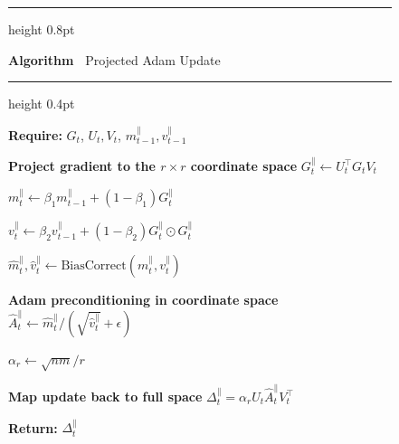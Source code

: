 \documentclass{article} %
\begin{document}
\begin{figure}
    \vspace{-10pt}
    \centering

    \hrule height 0.8pt

    \label{alg:resqadam-core}

    \noindent
    \begin{minipage}[c][1.1\baselineskip][c]{\linewidth}
        \raggedright
        \textbf{Algorithm~\thealgorithm}  Projected Adam Update
    \end{minipage}

    \hrule height 0.4pt
    \vspace{4pt}

    \begin{minipage}{0.53\columnwidth}
    \small
    \begin{algorithmic}

\State \textbf{Require:} $G_t$, $U_t,V_t$, $m_{t-1}^{\parallel},v_{t-1}^{\parallel}$

\State \textbf{Project gradient to the $r \times r$ coordinate space}
\Statex \hspace{\algorithmicindent} $G_t^{\parallel} \leftarrow U_t^\top G_t V_t$

\State $m_t^{\parallel} \leftarrow
\beta_1 m_{t-1}^{\parallel} + (1-\beta_1)G_t^{\parallel}$

\State $v_t^{\parallel} \leftarrow
\beta_2 v_{t-1}^{\parallel}
+ (1-\beta_2)G_t^{\parallel}\odot G_t^{\parallel}$

\State $\hat{m}_t^{\parallel},\hat{v}_t^{\parallel}
\leftarrow \text{BiasCorrect}(m_t^{\parallel},v_t^{\parallel})$

\State \textbf{Adam preconditioning in coordinate space}
\Statex \hspace{\algorithmicindent} $\hat{A}_t^{\parallel} \leftarrow
\hat{m}_t^{\parallel}/(\sqrt{\hat{v}_t^{\parallel}}+\epsilon)$

\State $\alpha_r \leftarrow \sqrt{nm}/r$

\State \textbf{Map update back to full space}
\Statex \hspace{\algorithmicindent} $\Delta_t^{\parallel}=\alpha_r U_t \hat{A}_t^{\parallel} V_t^\top$

\State \textbf{Return:} $\Delta_t^{\parallel}$

\end{algorithmic}
    \end{minipage}


\end{figure}
\end{document}
